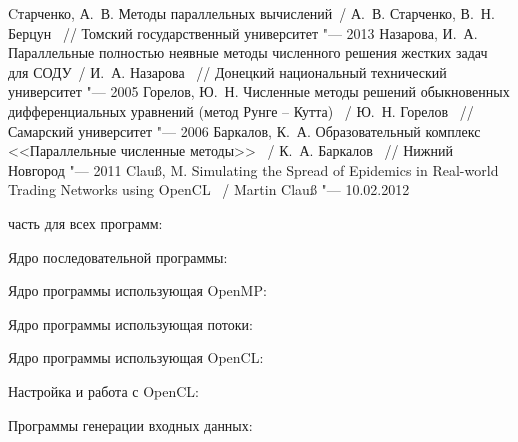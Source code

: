 \documentclass[14pt,final,titlepage,pscyr]{hedwork}
\begin{document}
\newpage

\renewcommand{\bibname}{Список используемой литературы}
\begin{thebibliography}{10}
	 Cтарченко, А.~В. Методы параллельных вычислений~/ А.~В. Старченко, В.~Н. Берцун ~// 
		Томский государственный университет "--- 2013
	 Назарова, И.~А. Параллельные полностью неявные методы численного решения жестких 
		задач для СОДУ~/ И.~А. Назарова ~// Донецкий национальный технический университет "--- 2005
	 Горелов, Ю.~Н. Численные методы решений обыкновенных дифференциальных уравнений 
		(метод Рунге -- Кутта) ~/ Ю.~Н. Горелов ~// Самарский университет "--- 2006
	 Баркалов, К.~А. Образовательный комплекс <<Параллельные численные методы>> ~/ 
		К.~А. Баркалов ~// Нижний Новгород "--- 2011
	 Clauß, M. Simulating the Spread of Epidemics in Real-world Trading Networks 
		using OpenCL ~/ Martin Clauß "--- 10.02.2012
\end{thebibliography}

\newpage

\label{sec:app}
 часть для всех программ:


\newpage

Ядро последовательной программы:


\newpage

Ядро программы использующая OpenMP:


\newpage

Ядро программы использующая потоки:


\newpage

Ядро программы использующая OpenCL:


Настройка и работа с OpenCL:


Программы генерации входных данных:



\end{document}
